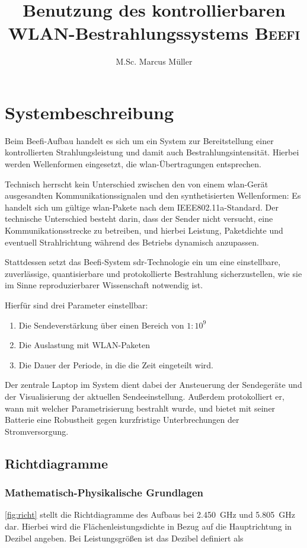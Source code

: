 \documentclass[a4paper,twoside]{scrreprt}
\title{Benutzung des kontrollierbaren WLAN-Bestrahlungssystems \textsc{Beefi}}
\author{M.Sc. Marcus Müller}
\newcommand{\lowf}{\SI{2.450}{\giga\hertz}}
\newcommand{\highf}{\SI{5.805}{\giga\hertz}}
\begin{document}
\maketitle
\chapter{Systembeschreibung}

Beim Beefi-Aufbau handelt es sich um ein System zur Bereitstellung einer
kontrollierten Strahlungsleistung und damit auch Bestrahlungsintensität. Hierbei
werden Wellenformen eingesetzt, die \gls{wlan}-Übertragungen entsprechen.

Technisch herrscht kein Unterschied zwischen den von einem \gls{wlan}-Gerät
ausgesandten Kommunikationssignalen und den synthetisierten Wellenformen: Es
handelt sich um gültige \gls{wlan}-Pakete nach dem IEEE802.11a-Standard. Der
technische Unterschied besteht darin, dass der Sender nicht versucht, eine
Kommunikationsstrecke zu betreiben, und hierbei Leistung, Paketdichte und
eventuell Strahlrichtung während des Betriebs dynamisch anzupassen.

Stattdessen setzt das Beefi-System \gls{sdr}-Technologie ein um eine
einstellbare, zuverlässige, quantisierbare und protokollierte Bestrahlung
sicherzustellen, wie sie im Sinne reproduzierbarer Wissenschaft notwendig ist.

Hierfür sind drei Parameter einstellbar:

\begin{enumerate}
\item Die Sendeverstärkung über einen Bereich von $1:10^9$
\item Die Auslastung mit WLAN-Paketen
\item Die Dauer der Periode, in die die Zeit eingeteilt wird.
\end{enumerate}

Der zentrale Laptop im System dient dabei der Ansteuerung der Sendegeräte und
der Visualisierung der aktuellen Sendeeinstellung. Außerdem protokolliert er,
wann mit welcher Parametrisierung bestrahlt wurde, und bietet mit seiner
Batterie eine Robustheit gegen kurzfristige Unterbrechungen der
Stromversorgung.

\section{Richtdiagramme}

\subsection{Mathematisch-Physikalische Grundlagen}
\autoref{fig:richt} stellt die Richtdiagramme des Aufbaus bei \lowf{} und \highf{}
dar. Hierbei wird die Flächenleistungsdichte in Bezug auf die Hauptrichtung in
Dezibel angeben. Bei Leistungsgrößen ist das Dezibel definiert als
\end{document}
